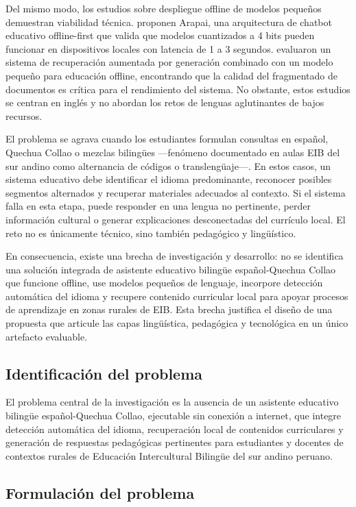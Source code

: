 Del mismo modo, los estudios sobre despliegue offline de modelos pequeños demuestran viabilidad técnica. \citet{Walusimbi2026} proponen Arapai, una arquitectura de chatbot educativo offline-first que valida que modelos cuantizados a 4 bits pueden funcionar en dispositivos locales con latencia de 1 a 3 segundos. \citet{Hevia2025} evaluaron un sistema de recuperación aumentada por generación combinado con un modelo pequeño para educación offline, encontrando que la calidad del fragmentado de documentos es crítica para el rendimiento del sistema. No obstante, estos estudios se centran en inglés y no abordan los retos de lenguas aglutinantes de bajos recursos.

El problema se agrava cuando los estudiantes formulan consultas en español, Quechua Collao o mezclas bilingües —fenómeno documentado en aulas EIB del sur andino como alternancia de códigos o translengüaje—. En estos casos, un sistema educativo debe identificar el idioma predominante, reconocer posibles segmentos alternados y recuperar materiales adecuados al contexto. Si el sistema falla en esta etapa, puede responder en una lengua no pertinente, perder información cultural o generar explicaciones desconectadas del currículo local. El reto no es únicamente técnico, sino también pedagógico y lingüístico.

En consecuencia, existe una brecha de investigación y desarrollo: no se identifica una solución integrada de asistente educativo bilingüe español-Quechua Collao que funcione offline, use modelos pequeños de lenguaje, incorpore detección automática del idioma y recupere contenido curricular local para apoyar procesos de aprendizaje en zonas rurales de EIB. Esta brecha justifica el diseño de una propuesta que articule las capas lingüística, pedagógica y tecnológica en un único artefacto evaluable.

\subsection{Identificación del problema}
El problema central de la investigación es la ausencia de un asistente educativo bilingüe español-Quechua Collao, ejecutable sin conexión a internet, que integre detección automática del idioma, recuperación local de contenidos curriculares y generación de respuestas pedagógicas pertinentes para estudiantes y docentes de contextos rurales de Educación Intercultural Bilingüe del sur andino peruano.

\subsection{Formulación del problema}
